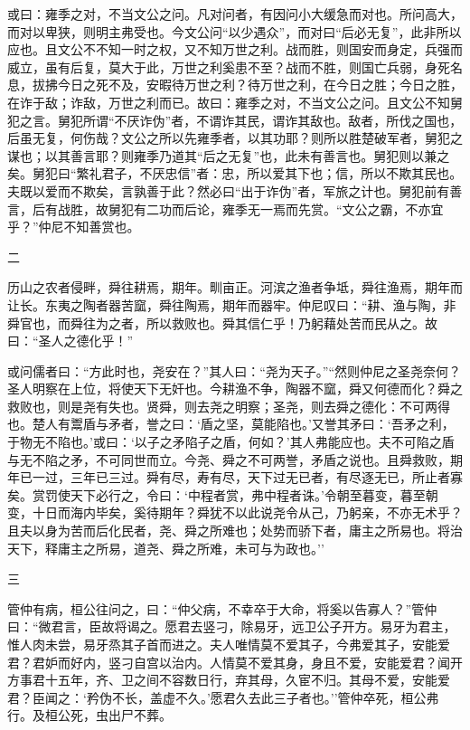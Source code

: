 \documentclass[]{article}
\begin{document}
或曰：雍季之对，不当文公之问。凡对问者，有因问小大缓急而对也。所问高大，而对以卑狭，则明主弗受也。今文公问``以少遇众''，而对曰``后必无复''，此非所以应也。且文公不不知一时之权，又不知万世之利。战而胜，则国安而身定，兵强而威立，虽有后复，莫大于此，万世之利奚患不至？战而不胜，则国亡兵弱，身死名息，拔拂今日之死不及，安暇待万世之利？待万世之利，在今日之胜；今日之胜，在诈于敌；诈敌，万世之利而已。故曰：雍季之对，不当文公之问。且文公不知舅犯之言。舅犯所谓``不厌诈伪''者，不谓诈其民，谓诈其敌也。敌者，所伐之国也，后虽无复，何伤哉？文公之所以先雍季者，以其功耶？则所以胜楚破军者，舅犯之谋也；以其善言耶？则雍季乃道其``后之无复''也，此未有善言也。舅犯则以兼之矣。舅犯曰``繁礼君子，不厌忠信''者：忠，所以爱其下也；信，所以不欺其民也。夫既以爱而不欺矣，言孰善于此？然必曰``出于诈伪''者，军旅之计也。舅犯前有善言，后有战胜，故舅犯有二功而后论，雍季无一焉而先赏。``文公之霸，不亦宜乎？''仲尼不知善赏也。

二

历山之农者侵畔，舜往耕焉，期年。甽亩正。河滨之渔者争坻，舜往渔焉，期年而让长。东夷之陶者器苦窳，舜往陶焉，期年而器牢。仲尼叹曰：``耕、渔与陶，非舜官也，而舜往为之者，所以救败也。舜其信仁乎！乃躬藉处苦而民从之。故曰：``圣人之德化乎！''

或问儒者曰：``方此时也，尧安在？''其人曰：``尧为天子。''``然则仲尼之圣尧奈何？圣人明察在上位，将使天下无奸也。今耕渔不争，陶器不窳，舜又何德而化？舜之救败也，则是尧有失也。贤舜，则去尧之明察；圣尧，则去舜之德化：不可两得也。楚人有鬻盾与矛者，誉之曰：`盾之坚，莫能陷也。'又誉其矛曰：`吾矛之利，于物无不陷也。'或曰：`以子之矛陷子之盾，何如？'其人弗能应也。夫不可陷之盾与无不陷之矛，不可同世而立。今尧、舜之不可两誉，矛盾之说也。且舜救败，期年已一过，三年已三过。舜有尽，寿有尽，天下过无已者，有尽逐无已，所止者寡矣。赏罚使天下必行之，令曰：`中程者赏，弗中程者诛。'令朝至暮变，暮至朝变，十日而海内毕矣，奚待期年？舜犹不以此说尧令从己，乃躬亲，不亦无术乎？且夫以身为苦而后化民者，尧、舜之所难也；处势而骄下者，庸主之所易也。将治天下，释庸主之所易，道尧、舜之所难，未可与为政也。''

三

管仲有病，桓公往问之，曰：``仲父病，不幸卒于大命，将奚以告寡人？''管仲曰：``微君言，臣故将谒之。愿君去竖刁，除易牙，远卫公子开方。易牙为君主，惟人肉未尝，易牙烝其子首而进之。夫人唯情莫不爱其子，今弗爱其子，安能爱君？君妒而好内，竖刁自宫以治内。人情莫不爱其身，身且不爱，安能爱君？闻开方事君十五年，齐、卫之间不容数日行，弃其母，久宦不归。其母不爱，安能爱君？臣闻之：`矜伪不长，盖虚不久。'愿君久去此三子者也。''管仲卒死，桓公弗行。及桓公死，虫出尸不葬。
\end{document}
